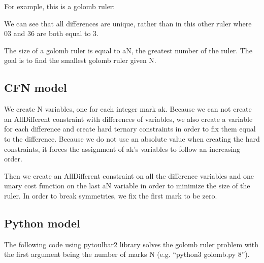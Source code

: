 \documentclass[letterpaper,10pt,openany,oneside,english]{sphinxmanual}
\begin{document}
\sphinxAtStartPar
For example, this is a golomb ruler:

\noindent{}

\sphinxAtStartPar
We can see that all differences are unique, rather than in this other ruler where 0\sphinxhyphen{}3 and 3\sphinxhyphen{}6 are both equal to 3.

\noindent{}

\sphinxAtStartPar
The size of a golomb ruler is equal to aN, the greatest number of the ruler. The goal is to find the smallest golomb ruler given N.


\subsection{CFN model}
\label{\detokenize{examples/tuto_grp:cfn-model}}
\sphinxAtStartPar
We create N variables, one for each integer mark ak. Because we can not create an AllDifferent constraint with differences of variables, we also create a variable for each difference and create hard ternary constraints in order to fix them equal to the difference.
Because we do not use an absolute value when creating the hard constraints, it forces the assignment of ak’s variables to follow an increasing order.

\sphinxAtStartPar
Then we create an AllDifferent constraint on all the difference variables and one unary cost function on the last aN variable in order to minimize the size of the ruler.
In order to break symmetries, we fix the first mark to be zero.


\subsection{Python model}
\label{\detokenize{examples/tuto_grp:python-model}}
\sphinxAtStartPar
The following code using pytoulbar2 library solves the golomb ruler problem with the first argument being the number of marks N (e.g. “python3 golomb.py 8”).

\sphinxAtStartPar
{}
\end{document}
